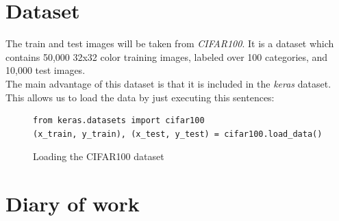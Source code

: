 \documentclass[12pt,spanish]{article}
\begin{document}
\section{Dataset}

The train and test images will be taken from \emph{CIFAR100}. It is a dataset which contains 50,000 32x32 color training images, labeled over 100 categories, and 10,000 test images. \\

The main advantage of this dataset is that it is included in the \textit{keras} dataset. This allows us to load the data by just executing this sentences:

\begin{figure}[H]
\centering
\begin{verbatim}
from keras.datasets import cifar100
(x_train, y_train), (x_test, y_test) = cifar100.load_data()
\end{verbatim}
\caption{Loading the CIFAR100 dataset}
\end{figure}

\section{Diary of work}
\end{document}
